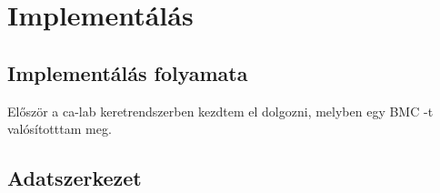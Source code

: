 \chapter{Implementálás}

\section{Implementálás folyamata}

Először a ca-lab keretrendszerben kezdtem el dolgozni, melyben egy BMC -t valósítotttam meg.

\section{Adatszerkezet}